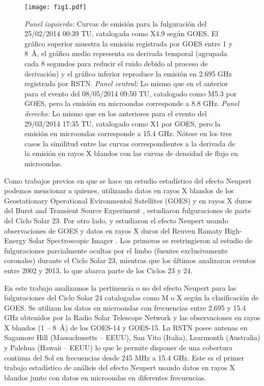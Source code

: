 \documentclass[baaa]{baaa}
\begin{document}
 \begin{figure*}[h]
\centering
\texttt{[image: fig1.pdf]}
\caption{\emph{Panel izquierdo:} Curvas de emisi\'on para la fulguraci\'on del 25/02/2014 00:39 TU, catalogada como X4.9 
seg\'un GOES. El gr\'afico superior muestra la emisi\'on registrada por GOES entre 1 y 8~\AA, el gr\'afico medio 
representa su derivada temporal (agrupada cada 8 segundos para reducir el ruido debido al proceso de derivaci\'on) y el 
gr\'afico inferior reproduce la emisi\'on en 2.695 GHz registrada por RSTN. \emph{Panel central:} Lo mismo que en el anterior 
para el evento del 08/05/2014  09:50 TU, catalogado como M5.3 por GOES, pero la emisi\'on en microondas corresponde a 8.8 GHz. 
\emph{Panel derecho:} Lo mismo que en los anteriores para el evento del 29/03/2014  17:35 TU, catalogado como X1 por GOES, 
pero  la emisi\'on en microondas corresponde a 15.4 GHz. N\'otese en los tres casos la similitud entre las curvas correspondientes 
a la derivada de la emisi\'on en rayos X blandos con las curvas de densidad de flujo en microondas.}
\label{Figura1}
\end{figure*}
Como trabajos previos en que se hace un estudio estad\'istico del efecto Neupert podemos mencionar a 
\citet{Veronigetal:2002} quienes, utilizando datos en rayos X blandos de los Geostationary Operational Evironmental Satellites (GOES) y en rayos X duros del Burst and Transient Source Experiment \citep[BATSE,][]{Harmonetal:2004}, estudiaron fulguraciones de parte del Ciclo Solar 23. Por otro lado, \citet{Effenbergeretal:2017} y \citet{Yuetal:2021} estudiaron el efecto Neupert usando 
observaciones de GOES y datos en rayos X duros del Reuven Ramaty High-Energy Solar Spectroscopic Imager \citep[RHESSI,][]{Linetal:2002}. 
Los primeros se restringieron al estudio de fulguraciones parcialmente ocultas por el limbo (fuentes exclusivamente coronales) 
durante el Ciclo Solar 23, mientras que los \'ultimos analizaron eventos entre 2002 y 2013, lo que abarca parte de los Ciclos 23 y 24.

En este trabajo analizamos la pertinencia o no del efecto Neupert para las fulguraciones del Ciclo Solar 24 
catalogadas como M o X seg\'un la clasificaci\'on de GOES. Se utilizan los datos en microondas con frecuencias 
entre 2.695 y 15.4 GHz obtenidos por la Radio Solar Telescope Network \citep[RSTN,][]{Guidiceetal:1981} y las 
observaciones en rayos X blandos (1 -- 8~{\AA}) de los GOES-14 y GOES-15. La RSTN posee antenas en Sagamore Hill 
(Massachusetts -- EEUU), San Vito (Italia), Learmonth (Australia) y Palehua (Hawaii -- EEUU) lo que le permite disponer 
de una cobertura continua del Sol en frecuencias desde 245 MHz a 15.4 GHz. Este es el primer trabajo estad\'istico de an\'alisis del efecto Neupert usando datos en rayos X blandos junto con datos en microondas en diferentes frecuencias. 
\end{document}
